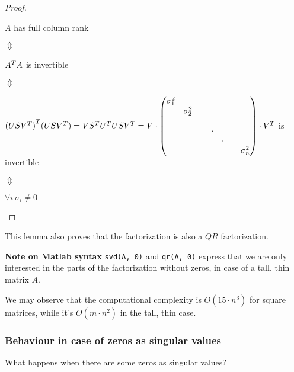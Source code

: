 \documentclass[computational_mathematics.tex]{subfiles}
\begin{document}
\begin{proof}
  \begin{center}
  $A$ has full column rank 
  
  $\Updownarrow$

  ${A}^{T}A$ is invertible
  
$\Updownarrow$
  
  ${(US{V}^{T})}^{T} (US{V}^{T}) = V{S}^{T}{U}^{T}US{V}^{T}
    = V \cdot  \begin{pmatrix}
    \sigma_{1}^2 & & & & &\\
    & \sigma_{2}^2 & & & &\\
    & & \cdot & & &\\
    & & & \cdot & &\\
    & & & & \cdot &\\
    & & & & & & \sigma_{n}^2\\ 
  \end{pmatrix} \cdot {V}^{T}$
  is invertible 
  
$\Updownarrow$
  
  $\forall i ~ \sigma_i \neq 0$
\end{center}
\end{proof}

\begin{obs}
This lemma also proves that the factorization is also a $QR$ factorization.
\end{obs}
\begin{myframe}{\bf Note on Matlab syntax}
  \texttt{svd(A, 0)} and \texttt{qr(A, 0)} express that we are only interested in the parts of the factorization without zeros, in case of a tall, thin matrix $A$.
\end{myframe}
 We may observe that the computational complexity is $O(15 \cdot n^3)$ for square matrices, while it's $O(m \cdot n^2)$ in the tall, thin case.

 \subsubsection{Behaviour in case of zeros as singular values}
 What happens when there are some zeros as singular values? 
 
\end{document}

